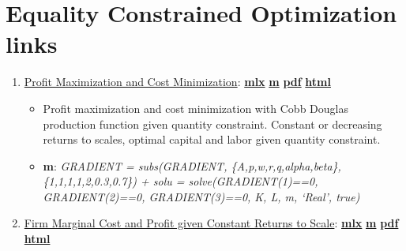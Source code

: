 \documentclass[
]{book}
\providecommand{\tightlist}{%
  \setlength{\itemsep}{0pt}\setlength{\parskip}{0pt}}
\begin{document}
\hypertarget{equality-constrained-optimization-links}{%
\section{Equality Constrained Optimization links}\label{equality-constrained-optimization-links}}

\begin{enumerate}
\def\labelenumi{\arabic{enumi}.}
\tightlist
\item
  \href{https://Math4Econ.github.io/opti_firm_constrained/htmlpdfm/profit_maximize.html}{Profit Maximization and Cost Minimization}: \href{https://github.com/Math4Econ/Math4Econ.github.io/blob/main/opti_firm_constrained/profit_maximize.mlx}{\textbf{mlx}} \textbar{} \href{https://github.com/Math4Econ/Math4Econ.github.io/blob/main/opti_firm_constrained/htmlpdfm/profit_maximize.m}{\textbf{m}} \textbar{} \href{https://github.com/Math4Econ/Math4Econ.github.io/blob/main/opti_firm_constrained/htmlpdfm/profit_maximize.pdf}{\textbf{pdf}} \textbar{} \href{https://Math4Econ.github.io/opti_firm_constrained/htmlpdfm/profit_maximize.html}{\textbf{html}}

  \begin{itemize}
  \tightlist
  \item
    Profit maximization and cost minimization with Cobb Douglas production function given quantity constraint. Constant or decreasing returns to scales, optimal capital and labor given quantity constraint.
  \item
    \textbf{m}: \emph{GRADIENT = subs(GRADIENT, \{A,p,w,r,q,alpha,beta\},\{1,1,1,1,2,0.3,0.7\}) + solu = solve(GRADIENT(1)==0, GRADIENT(2)==0, GRADIENT(3)==0, K, L, m, `Real', true)}
  \end{itemize}
\item
  \href{https://Math4Econ.github.io/opti_firm_constrained/htmlpdfm/profit_maximize_crs_profit.html}{Firm Marginal Cost and Profit given Constant Returns to Scale}: \href{https://github.com/Math4Econ/Math4Econ.github.io/blob/main/opti_firm_constrained/profit_maximize_crs_profit.mlx}{\textbf{mlx}} \textbar{} \href{https://github.com/Math4Econ/Math4Econ.github.io/blob/main/opti_firm_constrained/htmlpdfm/profit_maximize_crs_profit.m}{\textbf{m}} \textbar{} \href{https://github.com/Math4Econ/Math4Econ.github.io/blob/main/opti_firm_constrained/htmlpdfm/profit_maximize_crs_profit.pdf}{\textbf{pdf}} \textbar{} \href{https://Math4Econ.github.io/opti_firm_constrained/htmlpdfm/profit_maximize_crs_profit.html}{\textbf{html}}


\end{enumerate}
\end{document}
